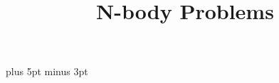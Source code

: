 \documentclass[11pt]{beamer}
\begin{document}
\parskip=10pt plus 5pt minus 3pt

\title{N-body Problems}
\author{\hpcteachers}
\date{\hpcsemester}

\begin{frame}
  \titlepage
\end{frame}


\end{document}
